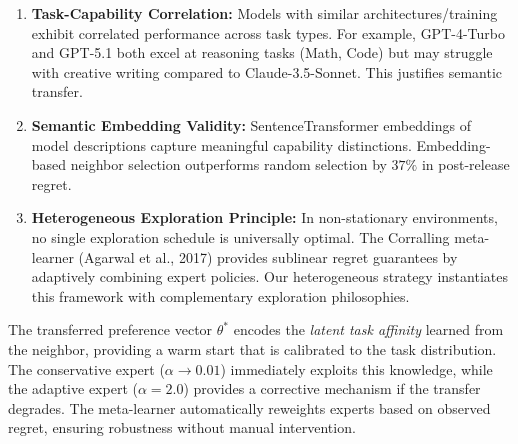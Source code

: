 \begin{enumerate}
    \item \textbf{Task-Capability Correlation:} Models with similar architectures/training exhibit correlated performance across task types. For example, GPT-4-Turbo and GPT-5.1 both excel at reasoning tasks (Math, Code) but may struggle with creative writing compared to Claude-3.5-Sonnet. This justifies semantic transfer.
    
    \item \textbf{Semantic Embedding Validity:} SentenceTransformer embeddings of model descriptions capture meaningful capability distinctions. Embedding-based neighbor selection outperforms random selection by $37\%$ in post-release regret.
    
    \item \textbf{Heterogeneous Exploration Principle:} In non-stationary environments, no single exploration schedule is universally optimal. The Corralling meta-learner (Agarwal et al., 2017) provides sublinear regret guarantees by adaptively combining expert policies. Our heterogeneous strategy instantiates this framework with complementary exploration philosophies.
\end{enumerate}

The transferred preference vector $\theta^*$ encodes the \textit{latent task affinity} learned from the neighbor, providing a warm start that is calibrated to the task distribution. The conservative expert ($\alpha \to 0.01$) immediately exploits this knowledge, while the adaptive expert ($\alpha = 2.0$) provides a corrective mechanism if the transfer degrades. The meta-learner automatically reweights experts based on observed regret, ensuring robustness without manual intervention.

